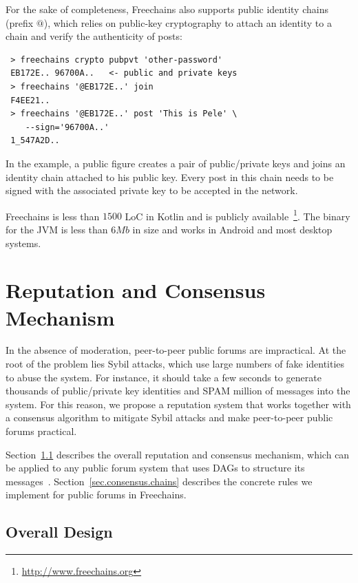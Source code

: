 \documentclass[10pt,journal,compsoc]{IEEEtran}
\newcommand{\FC}       {Freechains\xspace}
\begin{document}
For the sake of completeness, \FC also supports public identity chains (prefix
$@$), which relies on public-key cryptography to attach an identity to a chain
and verify the authenticity of posts:

{\footnotesize
\begin{verbatim}
 > freechains crypto pubpvt 'other-password'
 EB172E.. 96700A..   <- public and private keys
 > freechains '@EB172E..' join
 F4EE21..
 > freechains '@EB172E..' post 'This is Pele' \
    --sign='96700A..'
 1_547A2D..
\end{verbatim}
}

In the example, a public figure creates a pair of public/private keys and joins
an identity chain attached to his public key.
Every post in this chain needs to be signed with the associated private key to
be accepted in the network.

\FC is less than $1500$ LoC in Kotlin and is publicly
available~\footnote{\url{http://www.freechains.org}}.
The binary for the JVM is less than $6Mb$ in size and works in Android and most
desktop systems.

\section{Reputation and Consensus Mechanism}
\label{sec.consensus}

In the absence of moderation, peer-to-peer public forums are impractical.
At the root of the problem lies Sybil attacks, which use large numbers of fake
identities to abuse the system.
For instance, it should take a few seconds to generate thousands of
public/private key identities and SPAM million of messages into the system.
For this reason, we propose a reputation system that works together with a
consensus algorithm to mitigate Sybil attacks and make peer-to-peer public
forums practical.

Section~\ref{sec.consensus.design} describes the overall reputation and
consensus mechanism, which can be applied to any public forum system that uses
DAGs to structure its messages~\cite{33,34,p2p.merkle-crdts}.
Section~\ref{sec.consensus.chains} describes the concrete rules we implement
for public forums in \FC.

\subsection{Overall Design}
\label{sec.consensus.design}
\end{document}
